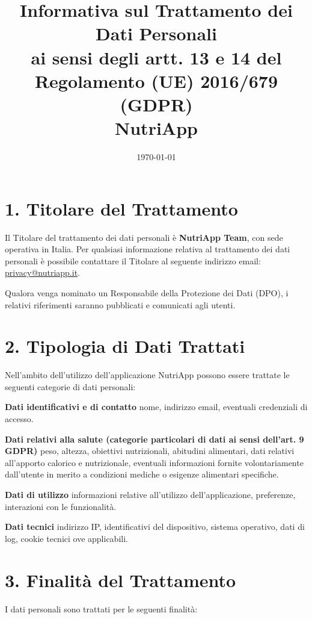 \documentclass[a4paper,12pt]{article}
\title{\textbf{Informativa sul Trattamento dei Dati Personali}\\
ai sensi degli artt. 13 e 14 del Regolamento (UE) 2016/679 (GDPR)\\
NutriApp}
\date{\today}
\begin{document}
    \maketitle

    \section*{1. Titolare del Trattamento}

    Il Titolare del trattamento dei dati personali è \textbf{NutriApp Team}, con sede operativa in Italia.
    Per qualsiasi informazione relativa al trattamento dei dati personali è possibile contattare il Titolare al seguente indirizzo email:
    \href{mailto:privacy@nutriapp.it}{privacy@nutriapp.it}.

    Qualora venga nominato un Responsabile della Protezione dei Dati (DPO), i relativi riferimenti saranno pubblicati e comunicati agli utenti.

    \section*{2. Tipologia di Dati Trattati}

    Nell’ambito dell’utilizzo dell’applicazione NutriApp possono essere trattate le seguenti categorie di dati personali:

    \textbf{Dati identificativi e di contatto}
    nome, indirizzo email, eventuali credenziali di accesso.

    \textbf{Dati relativi alla salute (categorie particolari di dati ai sensi dell’art. 9 GDPR)}
    peso, altezza, obiettivi nutrizionali, abitudini alimentari, dati relativi all’apporto calorico e nutrizionale, eventuali informazioni fornite volontariamente dall’utente in merito a condizioni mediche o esigenze alimentari specifiche.

    \textbf{Dati di utilizzo}
    informazioni relative all’utilizzo dell’applicazione, preferenze, interazioni con le funzionalità.

    \textbf{Dati tecnici}
    indirizzo IP, identificativi del dispositivo, sistema operativo, dati di log, cookie tecnici ove applicabili.

    \section*{3. Finalità del Trattamento}

    I dati personali sono trattati per le seguenti finalità:
\end{document}
